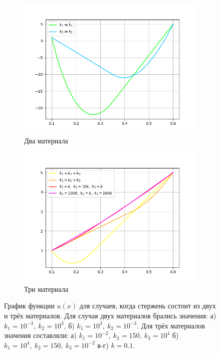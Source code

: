 \documentclass[12pt]{article}%
\begin{document}
\begin{figure}[H]
\centering
\begin{subfigure}{0.49\textwidth}
    \includegraphics[width=\textwidth]{task21.png}
    \caption{Два материала}
\end{subfigure}
\hfill
\begin{subfigure}{0.49\textwidth}
    \includegraphics[width=\textwidth]{task22.png}
    \caption{Три материала}
\end{subfigure}
\caption{График функции $u(x)$ для случаев, когда стержень состоит из двух и трёх материалов. 
Для случая двух материалов брались значения:
а) $k_1 = 10^{-3},\ k_2 = 10^3$, 
б) $k_1 = 10^3,\ k_2=10^{-3}$. 
Для трёх материалов значения составляли: 
а) $k_1=10^{-2},\ k_2=150,\ k_3=10^4$
б) $k_1=10^{4},\ k_2=150,\ k_3=10^{-2}$
в-г) $k=0.1$.}
\end{figure}
\end{document}
